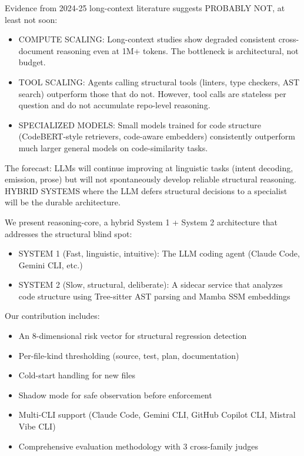 
Evidence from 2024-25 long-context literature suggests PROBABLY NOT, at least not soon:

\begin{itemize}
    \item COMPUTE SCALING: Long-context studies show degraded consistent cross-document reasoning even at 1M+ tokens. The bottleneck is architectural, not budget.
    \item TOOL SCALING: Agents calling structural tools (linters, type checkers, AST search) outperform those that do not. However, tool calls are stateless per question and do not accumulate repo-level reasoning.
    \item SPECIALIZED MODELS: Small models trained for code structure (CodeBERT-style retrievers, code-aware embedders) consistently outperform much larger general models on code-similarity tasks.
\end{itemize}

The forecast: LLMs will continue improving at linguistic tasks (intent decoding, emission, prose) but will not spontaneously develop reliable structural reasoning. HYBRID SYSTEMS where the LLM defers structural decisions to a specialist will be the durable architecture.


We present reasoning-core, a hybrid System 1 + System 2 architecture that addresses the structural blind spot:

\begin{itemize}
    \item SYSTEM 1 (Fast, linguistic, intuitive): The LLM coding agent (Claude Code, Gemini CLI, etc.)
    \item SYSTEM 2 (Slow, structural, deliberate): A sidecar service that analyzes code structure using Tree-sitter AST parsing and Mamba SSM embeddings
\end{itemize}

Our contribution includes:

\begin{itemize}
    \item An 8-dimensional risk vector for structural regression detection
    \item Per-file-kind thresholding (source, test, plan, documentation)
    \item Cold-start handling for new files
    \item Shadow mode for safe observation before enforcement
    \item Multi-CLI support (Claude Code, Gemini CLI, GitHub Copilot CLI, Mistral Vibe CLI)
    \item Comprehensive evaluation methodology with 3 cross-family judges
\end{itemize}

